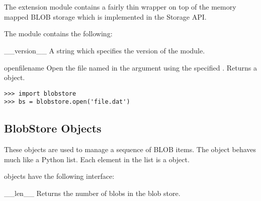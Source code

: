 %
%
%
\section{}


The  extension module contains a fairly thin wrapper
on top of the memory mapped BLOB storage which is implemented in the
Storage API.

The  module contains the following:

\begin{datadesc}{__version__}
A string which specifies the version of the  module.
\end{datadesc}

\begin{funcdesc}{open}{filename }
Open the file named in the  argument using the specified
.  Returns a  object.

\begin{verbatim}
>>> import blobstore
>>> bs = blobstore.open('file.dat')
\end{verbatim}
\end{funcdesc}

\subsection{BlobStore Objects}

These objects are used to manage a sequence of BLOB items.  The object
behaves much like a Python list.  Each element in the list is a
 object.

 objects have the following interface:

\begin{methoddesc}[BlobStore]{__len__}{}
Returns the number of blobs in the blob store.
\end{methoddesc}

